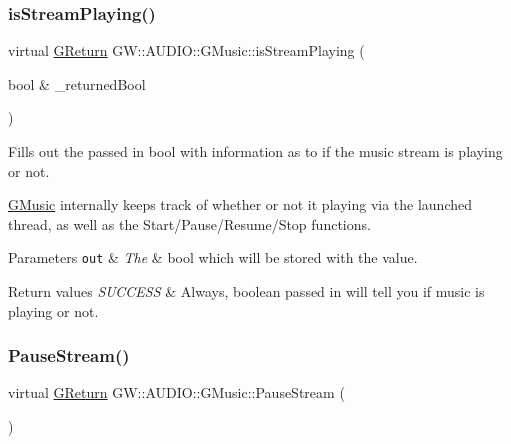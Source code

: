 \subsubsection{\texorpdfstring{is\+Stream\+Playing()}{isStreamPlaying()}}
{\footnotesize\ttfamily virtual \mbox{\hyperlink{namespaceGW_a67a839e3df7ea8a5c5686613a7a3de21}{G\+Return}} G\+W\+::\+A\+U\+D\+I\+O\+::\+G\+Music\+::is\+Stream\+Playing (\begin{DoxyParamCaption}\item[{bool \&}]{\+\_\+returned\+Bool }\end{DoxyParamCaption})\hspace{0.3cm}{\ttfamily [pure virtual]}}



Fills out the passed in bool with information as to if the music stream is playing or not. 

\mbox{\hyperlink{classGW_1_1AUDIO_1_1GMusic}{G\+Music}} internally keeps track of whether or not it playing via the launched thread, as well as the Start/\+Pause/\+Resume/\+Stop functions.


\begin{DoxyParams}[1]{Parameters}
\mbox{\tt out}  & {\em The} & bool which will be stored with the value.\\
\hline
\end{DoxyParams}

\begin{DoxyRetVals}{Return values}
{\em S\+U\+C\+C\+E\+SS} & Always, boolean passed in will tell you if music is playing or not. \\
\hline
\end{DoxyRetVals}
\mbox{\label{classGW_1_1AUDIO_1_1GMusic_a6a7a4efcf2d54bcf53429cedd7687e73}} 
\subsubsection{\texorpdfstring{Pause\+Stream()}{PauseStream()}}
{\footnotesize\ttfamily virtual \mbox{\hyperlink{namespaceGW_a67a839e3df7ea8a5c5686613a7a3de21}{G\+Return}} G\+W\+::\+A\+U\+D\+I\+O\+::\+G\+Music\+::\+Pause\+Stream (\begin{DoxyParamCaption}{ }\end{DoxyParamCaption})\hspace{0.3cm}{\ttfamily [pure virtual]}}



